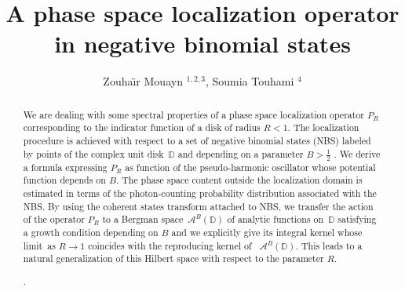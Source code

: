 \documentclass[12pt,reqno]{amsart}
\theoremstyle{definition}
\theoremstyle{remark}
\numberwithin{equation}{section}
\begin{document}
\pdfinterwordspaceon

\setcounter{page}{1}

\title[A phase space localization operator in negative binomial states]{
A phase space localization operator in negative binomial states}

\author[Zouha\"{\i}r Mouayn, Soumia Touhami ]{
 Zouha\"{\i}r Mouayn $^{1,2,3}$, Soumia Touhami $^4$}


\address{\footnotesize $^1$ Department of Mathematics, Faculty of Sciences and
Technics (M'Ghila), {\scriptsize Sultan Moulay Slimane University, B\'{e}ni Mellal, Morocco.}}
\address{\footnotesize $^2$ Institut des Hautes Études Scientifiques, Paris Saclay University
Le Bois-Marie, {\scriptsize 35 route de Chartres  CS 40001 91893 Bures-sur-Yvette, France.}}
\address{\footnotesize $^3$ Institut Henri Poincaré - UAR 839 Sorbonne University, / CNRS, {\scriptsize 11 rue Pierre et Marie Curie
75231 Paris Cedex 05 France.}}
\address{\footnotesize $^4$ Department of Mathematics, KTH Royal Institute
of Technology, {\scriptsize Stockholm, Sweden.}}







\keywords{}


\begin{abstract}
We are dealing with some spectral properties of a phase space localization
operator $P_{R}$ corresponding to the indicator function of a disk of radius 
$R<1.$ The localization procedure is achieved with respect to a set of
negative binomial states (NBS) labeled by points of the complex unit disk\ $%
\mathbb{D}$ and depending on a parameter $B>%
{\frac12}%
$ $.$ We derive a formula expressing $P_{R}$ as function of the
pseudo-harmonic oscillator whose potential function depends on $B$. The
phase space content outside the localization domain is estimated in terms of
the photon-counting probability distribution associated with the NBS. By
using the coherent states transform attached to NBS, we transfer the action
of the operator $P_{R}$ to a Bergman space\ $\mathcal{A}^{B}\left( \mathbb{D}%
\right) $ of analytic functions on\ $\mathbb{D}$ satisfying a growth
condition depending on $B$ and we explicitly give its integral kernel whose
limit\ as $R\rightarrow 1$ coincides with the reproducing kernel of \ $%
\mathcal{A}^{B}\left( \mathbb{D}\right) $. This leads to a natural
generalization of this Hilbert space with respect to the parameter $R$.

.
\end{abstract}
\end{document}
